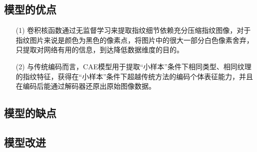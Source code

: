 \documentclass{whutmod}
\begin{document}
		\subsection{模型的优点}
			\begin{itemize}                                             
			\item [(1)] 卷积核函数通过无监督学习来提取指纹细节依赖充分压缩指纹图像，对于指纹图片来说是颜色为黑色的像素点，将图片中的很大一部分白色像素舍弃，只提取对网络有用的信息，到达降低数据维度的目的。
			\item [(2)] 与传统编码而言，CAE模型用于提取“小样本”条件下相同类型、相同纹理的指纹特征，获得在“小样本”条件下超越传统方法的编码个体表征能力，并且在编码后能通过解码器还原出原始图像数据。
			\end{itemize}
		\subsection{模型的缺点}
		

  		\subsection{模型改进}

  
  
\end{document}
